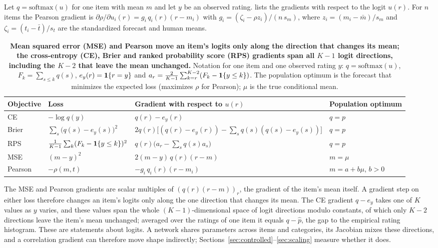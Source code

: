 \begin{proposition}
\label{prop:grad}
Let $q=\mathrm{softmax}(u)$ for one item with mean $m$ and let $y$ be an observed rating.
 lists the gradients with respect to the logit $u(r)$.
For $n$ items the Pearson gradient is $\partial\rho/\partial u_i(r)=g_i\,q_i(r)(r-m_i)$ with $g_i=(\zeta_i-\rho z_i)/(n\,s_m)$, where $z_i=(m_i-\bar m)/s_m$ and $\zeta_i=(t_i-\bar t)/s_t$ are the standardized forecast and human means.
\end{proposition}

\begin{table}[h]
\caption{\textbf{Mean squared error (MSE) and Pearson move an item's logits only along the direction that changes its mean; the cross-entropy (CE), Brier and ranked probability score (RPS) gradients span all $K-1$ logit directions, including the $K-2$ that leave the mean unchanged.}
Notation for one item and one observed rating $y$: $q=\mathrm{softmax}(u)$, $F_k=\sum_{s\le k}q(s)$, $e_y(r)=\mathbf{1}\{r=y\}$ and $a_r=\tfrac{2}{K-1}\sum_{k=r}^{K-2}(F_k-\mathbf{1}\{y\le k\})$.
The population optimum is the forecast that minimizes the expected loss (maximizes $\rho$ for Pearson); $\mu$ is the true conditional mean.}
\label{tab:losses}
\centering
\small
\begin{tabular}{@{}llll@{}}
\toprule
Objective & Loss & Gradient with respect to $u(r)$ & Population optimum \\
\midrule
CE & $-\log q(y)$ & $q(r)-e_y(r)$ & $q=p$ \\
Brier & $\sum_s\bigl(q(s)-e_y(s)\bigr)^2$ & $2q(r)\bigl[(q(r)-e_y(r))-\sum_sq(s)(q(s)-e_y(s))\bigr]$ & $q=p$ \\
RPS & $\tfrac1{K-1}\sum_k(F_k-\mathbf{1}\{y\le k\})^2$ & $q(r)\bigl(a_r-\sum_sq(s)a_s\bigr)$ & $q=p$ \\
MSE & $(m-y)^2$ & $2(m-y)\,q(r)(r-m)$ & $m=\mu$ \\
Pearson & $-\rho(m,t)$ & $-g_i\,q_i(r)(r-m_i)$ & $m=a+b\mu$, $b>0$ \\
\bottomrule
\end{tabular}
\end{table}

The MSE and Pearson gradients are scalar multiples of $(q(r)(r-m))_r$, the gradient of the item's mean itself.
A gradient step on either loss therefore changes an item's logits only along the one direction that changes its mean.
The CE gradient $q-e_y$ takes one of $K$ values as $y$ varies, and these values span the whole $(K-1)$-dimensional space of logit directions modulo constants, of which only $K-2$ directions leave the item's mean unchanged; averaged over the ratings of one item it equals $q-\hat p$, the gap to the empirical rating histogram.
These are statements about logits.
A network shares parameters across items and categories, its Jacobian mixes these directions, and a correlation gradient can therefore move shape indirectly; Sections~\ref{sec:controlled}--\ref{sec:scaling} measure whether it does.

